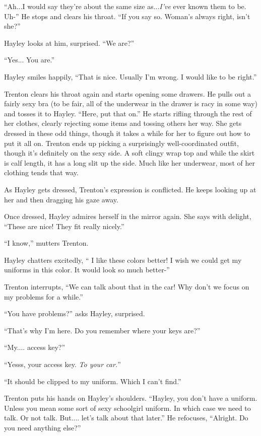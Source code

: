 ``Ah...I would say they're about the same size as...\textit{I've} ever known them to be.  Uh-''  He stops and clears his throat.  ``If you say so.  Woman's always right, isn't she?''

Hayley looks at him, surprised.  ``We are?''

``Yes... You are.''

Hayley smiles happily, ``That is nice.  Usually I'm wrong.  I would like to be right.''

Trenton clears his throat again and starts opening some drawers.  He pulls out a fairly sexy bra (to be fair, all of the underwear in the drawer is racy in some way) and tosses it to Hayley.  ``Here, put that on.''  He starts rifling through the rest of her clothes, clearly rejecting some items and tossing others her way.  She gets dressed in these odd things, though it takes a while for her to figure out how to put it all on.  Trenton ends up picking a surprisingly well-coordinated outfit, though it's definitely on the sexy side.  A soft clingy wrap top and while the skirt is calf length, it has a long slit up the side.  Much like her underwear, most of her clothing tends that way.  



As Hayley gets dressed, Trenton's expression is conflicted.  He keeps looking up at her and then dragging his gaze away.

Once dressed, Hayley admires herself in the mirror again.  She says with delight, ``These are nice!  They fit really nicely.''

``I know,'' mutters Trenton.

Hayley chatters excitedly, `` I like these colors better!  I wish we could get my uniforms in this color.  It would look so much better-''

Trenton interrupts, ``We can talk about that in the car!  Why don't we focus on my problems for a while.''

``You have problems?'' asks Hayley, surprised.

``That's why I'm here.  Do you remember where your keys are?''

``My.... access key?''

``Yesss, your access key.  \textit{To your car.}''

``It should be clipped to my uniform. Which I can't find.''

Trenton puts his hands on Hayley's shoulders.  ``Hayley, you don't have a uniform.  Unless you mean some sort of sexy schoolgirl uniform.  In which case we need to talk.  Or not talk.  But.... let's talk about that later.''  He refocuses, ``Alright.  Do you need anything else?''

